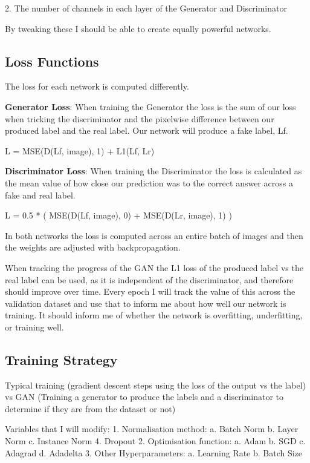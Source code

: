 \documentclass{UoYCSproject}
\begin{document}
2. The number of channels in each layer of the Generator and Discriminator

By tweaking these I should be able to create equally powerful networks. 

\subsection{Loss Functions}

The loss for each network is computed differently.

\textbf{Generator Loss}: When training the Generator the loss is the sum of our loss when tricking the discriminator and the pixelwise difference between our produced label and the real label. Our network will produce a fake label, Lf. 

L = MSE(D(Lf, image), 1) + L1(Lf, Lr) 

\textbf{Discriminator Loss}: When training the Discriminator the loss is calculated as the mean value of how close our prediction was to the correct answer across a fake and real label.

L = 0.5 * ( MSE(D(Lf, image), 0) + MSE(D(Lr, image), 1) ) 

In both networks the loss is computed across an entire batch of images and then the weights are adjusted with backpropagation.

When tracking the progress of the GAN the L1 loss of the produced label vs the real label can be used, as it is independent of the discriminator, and therefore should improve over time. Every epoch I will track the value of this across the validation dataset and use that to inform me about how well our network is training. It should inform me of whether the network is overfitting, underfitting, or training well. 

\subsection{Training Strategy}

Typical training (gradient descent steps using the loss of the output vs the label) vs GAN (Training a generator to produce the labels and a discriminator to determine if they are from the dataset or not)

Variables that I will modify:
1. Normalisation method:
a. Batch Norm
b. Layer Norm
c. Instance Norm
4. Dropout
2. Optimisation function:
a. Adam
b. SGD
c. Adagrad
d. Adadelta
3. Other Hyperparameters:
a. Learning Rate
b. Batch Size
\end{document}
